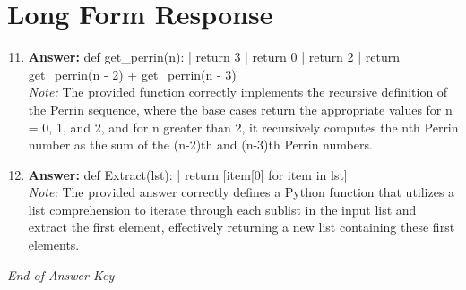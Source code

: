 \documentclass[12pt]{article}
\begin{document}
\section*{Long Form Response}
\begin{enumerate}[label=\arabic*.]
\setcounter{enumi}{10}
\item \textbf{Answer:} def get\_perrin(n): | return 3 | return 0 | return 2 | return get\_perrin(n - 2) + get\_perrin(n - 3)
\\ \textit{Note:} The provided function correctly implements the recursive definition of the Perrin sequence, where the base cases return the appropriate values for n = 0, 1, and 2, and for n greater than 2, it recursively computes the nth Perrin number as the sum of the (n-2)th and (n-3)th Perrin numbers.
\item \textbf{Answer:} def Extract(lst): | return [item[0] for item in lst]
\\ \textit{Note:} The provided answer correctly defines a Python function that utilizes a list comprehension to iterate through each sublist in the input list and extract the first element, effectively returning a new list containing these first elements.
\end{enumerate}

\vfill
\noindent\textit{End of Answer Key}
\end{document}
